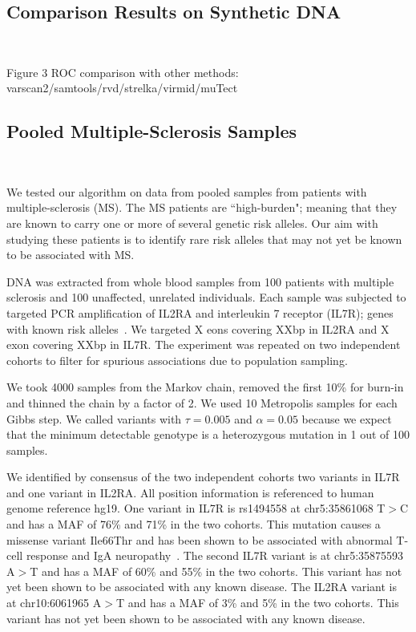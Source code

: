 \documentclass[11pt,reqno]{amsart}
\begin{document}
\subsection{Comparison Results on Synthetic DNA}\

Figure 3 ROC comparison with other methods: varscan2/samtools/rvd/strelka/virmid/muTect


\subsection{Pooled Multiple-Sclerosis Samples}\

We tested our algorithm on data from pooled samples from patients with multiple-sclerosis (MS). The MS patients are ``high-burden"; meaning that they are known to carry one or more of several genetic risk alleles. Our aim with studying these patients is to identify rare risk alleles that may not yet be known to be associated with MS. 

DNA was extracted from whole blood samples from 100 patients with multiple sclerosis and 100 unaffected, unrelated individuals. Each sample was subjected to targeted PCR amplification of IL2RA and interleukin 7 receptor (IL7R); genes with known risk alleles~\cite{HauserNEJM2007}. We targeted X eons covering XXbp in IL2RA and X exon covering XXbp in IL7R. The experiment was repeated on two independent cohorts to filter for spurious associations due to population sampling.

We took 4000 samples from the Markov chain, removed the first 10\% for burn-in and thinned the chain by a factor of 2. We used 10 Metropolis samples for each Gibbs step. We called variants with $\tau = 0.005$ and $\alpha = 0.05$ because we expect that the minimum detectable genotype is a heterozygous mutation in 1 out of 100 samples. 

We identified by consensus of the two independent cohorts two variants in IL7R and one variant in IL2RA. All position information is referenced to human genome reference hg19. One variant in IL7R is rs1494558 at chr5:35861068 T$>$C and has a MAF of 76\% and 71\% in the two cohorts. This mutation causes a missense variant Ile66Thr and has been shown to be associated with abnormal T-cell response and IgA neuropathy~\cite{HahnCho2011}. The second IL7R variant is at chr5:35875593 A$>$T and has a MAF of 60\% and 55\% in the two cohorts. This variant has not yet been shown to be associated with any known disease. The IL2RA variant is at chr10:6061965 A$>$T and has a MAF  of 3\% and 5\% in the two cohorts. This variant has not yet been shown to be associated with any known disease.
\end{document}
